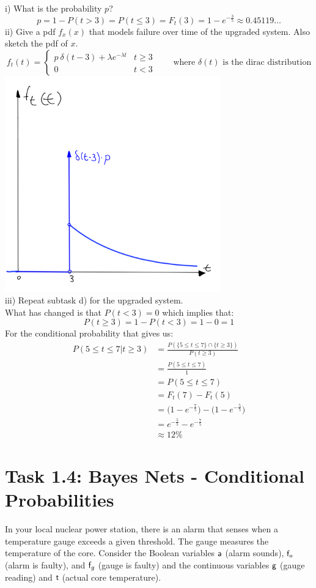 \documentclass[a4paper,footsepline]{scrartcl}
\begin{document}
	i) What is the probability $p$?\\
	\[ p = 1 - P(t > 3) = P(t \leq 3) = F_t(3) = 1 - e^{-\frac{3}{5}} \approx 0.45119 \dots \]
	ii) Give a pdf $f_ x(x)$ that models failure over time of the upgraded system. Also sketch
	the pdf of $x$.\\
	\[f_t(t) = \begin{cases} 
	p\ \delta(t-3) + \lambda e^{-\lambda t} & t \geq 3\\
	0 & t < 3
	\end{cases} \qquad \text{where } \delta(t) \text{ is the dirac distribution} \]
	\includegraphics[width=0.7\textwidth]{sketch2.png}\\
	iii) Repeat subtask d) for the upgraded system.\vspace{0.2cm}\\
	What has changed is that $P(t < 3)=0$ which implies that:\\ 
	\[P(t \geq 3) = 1-P(t < 3) = 1-0 =1\]
	For the conditional probability that gives us:
	\begin{align*}
	P(5 \leq t \leq 7 | t \geq 3) &= \frac{P(\{5 \leq t \leq 7\} \cap \{t \geq 3\} ) }{P(t \geq 3)}\\
	&= \frac{P(5 \leq t \leq 7)}{1}\\
	&= P(5 \leq t \leq 7)\\
	&= F_t(7) - F_t(5)\\
	&=\big(1-e^{-\frac{7}{5}}\big) - \big(1-e^{-\frac{5}{5}}\big)\\
	&= e^{-\frac{5}{5}}-e^{-\frac{7}{5}}\\
	&\approx 12\%
	\end{align*}
	\section*{Task 1.4: Bayes Nets - Conditional Probabilities}
	In your local nuclear power station, there is an alarm that senses when a
temperature gauge exceeds a given threshold. The gauge measures the temperature
of the core. Consider the Boolean variables $\rv{a}$ (alarm sounds), $\rv{f}_a$
(alarm is faulty), and $\rv{f}_g$ (gauge is faulty) and the continuous
variables $\rv{g}$ (gauge reading) and $\rv{t}$ (actual core temperature).
\end{document}
